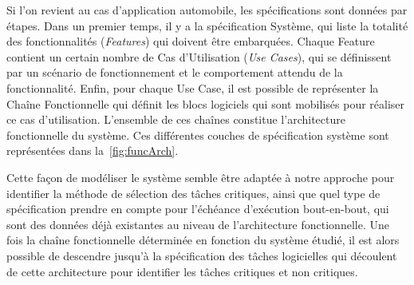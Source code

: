 \documentclass[french, a4paper, 11pt, twoside, pdftex]{StyleThese}
\begin{document}
	
		Si l'on revient au cas d'application automobile, les spécifications sont données par étapes. Dans un premier temps, il y a la spécification Système, qui liste la totalité des fonctionnalités (\emph{Features}) qui doivent être embarquées. Chaque Feature contient un certain nombre de Cas d'Utilisation (\emph{Use Cases}), qui se définissent par un scénario de fonctionnement et le comportement attendu de la fonctionnalité. Enfin, pour chaque Use Case, il est possible de représenter la Chaîne Fonctionnelle qui définit les blocs logiciels qui sont mobilisés pour réaliser ce cas d'utilisation. L'ensemble de ces chaînes constitue l'architecture fonctionnelle du système. Ces différentes couches de spécification système sont représentées dans la~\autoref{fig:funcArch}. %


		Cette façon de modéliser le système semble être adaptée à notre approche pour identifier la méthode de sélection des tâches critiques, ainsi que quel type de spécification prendre en compte pour l'échéance d'exécution bout-en-bout, qui sont des données déjà existantes au niveau de l'architecture fonctionnelle. Une fois la chaîne fonctionnelle déterminée en fonction du système étudié, il est alors possible de descendre jusqu'à la spécification des tâches logicielles qui découlent de cette architecture pour identifier les tâches critiques et non critiques.
		
\end{document}
